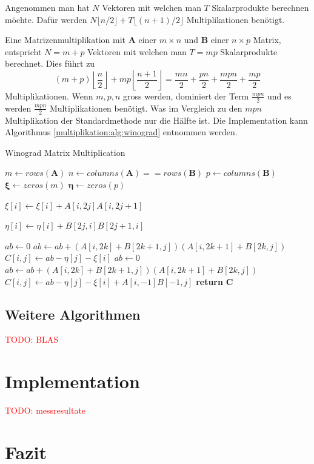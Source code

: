 Angenommen man hat $N$ Vektoren mit welchen man $T$ Skalarprodukte berechnen m\"ochte.
Daf\"ur werden $N\lfloor n/2 \rfloor + T\lfloor (n+1)/2 \rfloor $ Multiplikationen ben\"otigt.

Eine Matrizenmultiplikation mit $\mathbf{A}$ einer $m \times n$ und $\mathbf{B}$ einer $n \times p$ Matrix, entspricht $N=m+p$ Vektoren mit welchen man $T=mp$ Skalarprodukte berechnet.
Dies f\"uhrt zu
\begin{equation}
		(m+p) \left \lfloor \frac{n}{2} \right \rfloor + mp \left \lfloor \frac{n+1}{2} \right \rfloor = \frac{mn}{2} + \frac{pn}{2} + \frac{mpn}{2} + \frac{mp}{2}
\end{equation}
Multiplikationen.
Wenn $m,p,n$ gross werden, dominiert der Term $\frac{mpn}{2}$ und es werden $\frac{mpn}{2}$ Multiplikationen ben\"otigt.
Was im Vergleich zu den $mpn$ Multiplikation der Standardmethode nur die H\"alfte ist.
Die Implementation kann Algorithmus \ref{multiplikation:alg:winograd} entnommen werden.

\begin{algorithm}\caption{Winograd Matrix Multiplication}
	\setlength{\lineskip}{7pt}
	\label{multiplikation:alg:winograd}
	\begin{algorithmic}
		\State  $ m \gets rows(\mathbf{A})$
		\State  $ n \gets columns(\mathbf{A}) == rows(\mathbf{B})$
		\State  $ p \gets columns(\mathbf{B})$
		\State  $ \mathbf{\xi} \gets zeros(m)$
		\State  $ \mathbf{\eta} \gets zeros(p)$


		\State $\xi[i] \gets \xi[i]+A[i,2 j]A[i,2 j+1]$
		\EndFor
		\EndFor

		\State $\eta[i] \gets   \eta[i]+B[2 j,i]B[2 j+1,i]$
		\EndFor
		\EndFor

		\State $ab \gets 0$
		\State $ab \gets ab + (A[i,2k]+B[2k+1,j])(A[i,2k+1]+B[2k,j])$
		\EndFor
		\State $C[i,j] \gets ab-\eta[j]-\xi[i]$
		\EndFor
		\EndFor
    \Else
		\State $ab \gets 0$
		\State $ab \gets ab + (A[i,2k]+B[2k+1,j])(A[i,2k+1]+B[2k,j])$
		\EndFor
		\State $C[i,j] \gets ab-\eta[j]-\xi[i]+A[i,-1]B[-1,j]$
		\EndFor
		\EndFor
		\EndIf
		\State \textbf{return} $\textbf{C}$

		\EndFunction
	\end{algorithmic}
\end{algorithm}

\subsection{Weitere Algorithmen}

\textcolor{red}{TODO: BLAS}

\section{Implementation}
\textcolor{red}{TODO: messresultate}

\section{Fazit}
